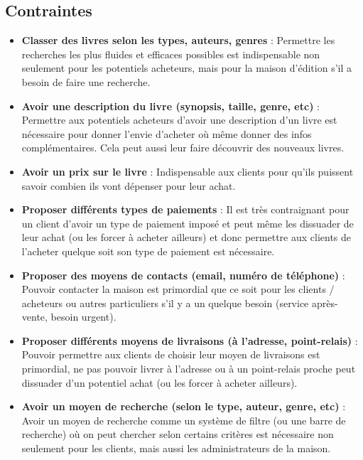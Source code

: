 \documentclass[14pt]{extarticle}
\begin{document}
\subsection{Contraintes}
\begin{itemize}
    \item \textbf{Classer des livres selon les types, auteurs, genres} : Permettre les recherches les plus fluides et efficaces possibles est indispensable non seulement pour les potentiels acheteurs, mais pour la maison d'édition s'il a besoin de faire une recherche.

    \item \textbf{Avoir une description du livre (synopsis, taille, genre, etc)} : Permettre aux potentiels acheteurs d'avoir une description d'un livre est nécessaire pour donner l'envie d'acheter où même donner des infos complémentaires. Cela peut aussi leur faire découvrir des nouveaux livres.
    
    \item \textbf{Avoir un prix sur le livre} : Indispensable aux clients pour qu'ils puissent savoir combien ils vont dépenser pour leur achat.
    
    \item \textbf{Proposer différents types de paiements} : Il est très contraignant pour un client d'avoir un type de paiement imposé et peut même les dissuader de leur achat (ou les forcer à acheter ailleurs) et donc permettre aux clients de l'acheter quelque soit son type de paiement est nécessaire.
    
    \item \textbf{Proposer des moyens de contacts (email, numéro de téléphone)} : Pouvoir contacter la maison est primordial que ce soit pour les clients / acheteurs ou autres particuliers s'il y a un quelque besoin (service après-vente, besoin urgent).
    
    \item \textbf{Proposer différents moyens de livraisons (à l'adresse, point-relais)} : Pouvoir permettre aux clients de choisir leur moyen de livraisons est primordial, ne pas pouvoir livrer à l'adresse ou à un point-relais proche peut dissuader d'un potentiel achat (ou les forcer à acheter ailleurs).
    
    \item \textbf{Avoir un moyen de recherche (selon le type, auteur, genre, etc)} : Avoir un moyen de recherche comme un système de filtre (ou une barre de recherche) où on peut chercher selon certains critères est nécessaire non seulement pour les clients, mais aussi les administrateurs de la maison.
    

\end{itemize}
\end{document}
